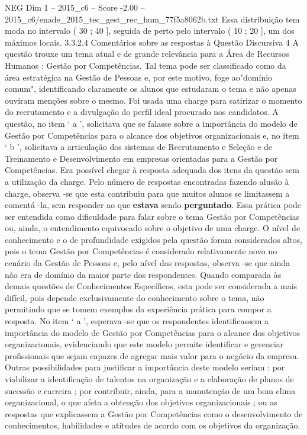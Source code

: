 \begin{textsample}{NEG Dim 1 – 2015\_c6 – Score -2.00 – 2015\_c6/enade\_2015\_tec\_gest\_rec\_hum\_77f5a8062b.txt}
Essa distribuição tem moda no intervalo ( 30 ; 40 ], seguida de perto pelo intervalo ( 10 ; 20 ], um dos máximos locais. 3.3.2.4 Comentários sobre as respostas à Questão Discursiva 4 A questão trouxe um tema atual e de grande relevância para a Área de Recursos Humanos : Gestão por Competências.
Tal tema pode ser classificado como da área estratégica na Gestão de Pessoas e, por este motivo, foge ao"domínio comum", identificando claramente os alunos que estudaram o tema e não apenas ouviram menções sobre o mesmo.
Foi usada uma charge para satirizar o momento do recrutamento e a divulgação do perfil ideal procurado nos candidatos.
A questão, no item ‘ a ’, solicitava que se falasse sobre a importância do modelo de Gestão por Competências para o alcance dos objetivos organizacionais e, no item ‘ b ’, solicitava a articulação dos sistemas de Recrutamento e Seleção e de Treinamento e Desenvolvimento em empresas orientadas para a Gestão por Competências.
Era possível chegar à resposta adequada dos itens da questão sem a utilização da charge.
Pelo número de respostas encontradas fazendo alusão à charge, observa -se que esta contribuiu para que muitos alunos se limitassem a comentá -la, sem responder ao que \textbf{estava} sendo \textbf{perguntado}.
Essa prática pode ser entendida como dificuldade para falar sobre o tema Gestão por Competências ou, ainda, o entendimento equivocado sobre o objetivo de uma charge.
O nível de conhecimento e o de profundidade exigidos pela questão foram considerados altos, pois o tema Gestão por Competências é considerado relativamente novo no cenário da Gestão de Pessoas e, pelo nível das respostas, observa -se que ainda não era de domínio da maior parte dos respondentes.
Quando comparada às demais questões de Conhecimentos Específicos, esta pode ser considerada a mais difícil, pois depende exclusivamente do conhecimento sobre o tema, não permitindo que se tomem exemplos da experiência prática para compor a resposta.
No item ‘ a ’, esperava -se que os respondentes identificassem a importância do modelo de Gestão por Competências para o alcance dos objetivos organizacionais, evidenciando que este modelo permite identificar e gerenciar profissionais que sejam capazes de agregar mais valor para o negócio da empresa.
Outras possibilidades para justificar a importância deste modelo seriam : por viabilizar a identificação de talentos na organização e a elaboração de planos de sucessão e carreira ; por contribuir, ainda, para a manutenção de um bom clima organizacional, o que afeta a obtenção dos objetivos organizacionais ; ou as respostas que explicassem a Gestão por Competências como o desenvolvimento de conhecimentos, habilidades e atitudes de acordo com os objetivos da organização.

\end{textsample}
